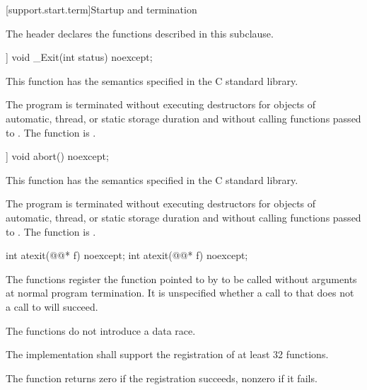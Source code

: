 [support.start.term]{Startup and termination}

\pnum
\begin{note}
The header 
declares the functions described in this subclause.
\end{note}

%
\begin{itemdecl}
[[noreturn]] void _Exit(int status) noexcept;
\end{itemdecl}

\begin{itemdescr}
\pnum
\effects
This function has the semantics specified in the C standard library.

\pnum
\remarks
The program is terminated without executing destructors for objects of automatic,
thread, or static storage duration and without calling functions passed to
.
%
The function  is .
\end{itemdescr}

%
\begin{itemdecl}
[[noreturn]] void abort() noexcept;
\end{itemdecl}

\begin{itemdescr}
\pnum
\effects
This function has the semantics specified in the C standard library.

\pnum
\remarks
The program is terminated without executing destructors for objects of
automatic, thread, or static storage
duration and without calling functions passed to
.
%
The function  is .
\end{itemdescr}

%
\begin{itemdecl}
int atexit(@@* f) noexcept;
int atexit(@@* f) noexcept;
\end{itemdecl}

\begin{itemdescr}
\pnum
\effects
The
functions register the function pointed to by 
to be called without arguments at normal program termination.
It is unspecified whether a call to  that does not
a call to  will succeed.
\begin{note}
The  functions do not introduce a data
race.
\end{note}

\pnum
\implimits
The implementation shall support the registration of at least 32 functions.

\pnum
\returns
The
function returns zero if the registration succeeds,
nonzero if it fails.
\end{itemdescr}

